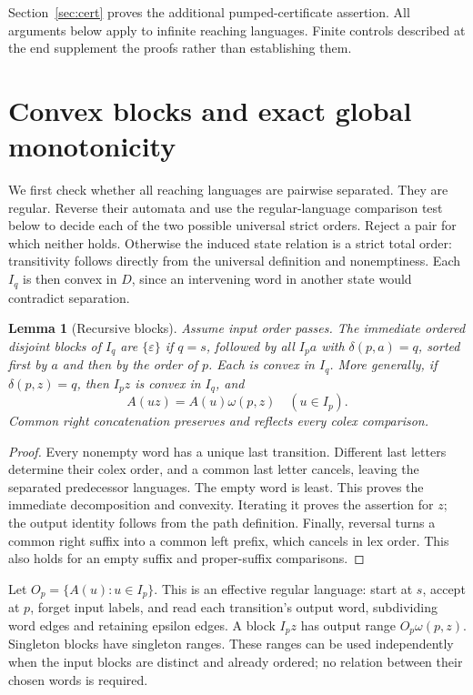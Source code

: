 \documentclass[acmsmall,screen,nonacm,11pt]{acmart}
\newcommand{\eps}{\varepsilon}
\newtheorem{lemma}[theorem]{Lemma}
\theoremstyle{definition}
\begin{document}
Section~\ref{sec:cert} proves the additional pumped-certificate assertion.
All arguments below apply to infinite reaching languages. Finite controls
described at the end supplement the proofs rather than establishing them.

\section{Convex blocks and exact global monotonicity}\label{sec:blocks}

We first check whether all reaching languages are pairwise separated. They
are regular. Reverse their automata and use the regular-language comparison
test below to decide each of the two possible universal strict orders.
Reject a pair for which neither holds. Otherwise the induced state relation
is a strict total order: transitivity follows directly from the universal
definition and nonemptiness. Each $I_q$ is then convex in $D$, since an
intervening word in another state would contradict separation.

\begin{lemma}[Recursive blocks]\label{lem:blocks}
Assume input order passes. The immediate ordered disjoint blocks of $I_q$
are $\{\eps\}$ if $q=s$, followed by all $I_p a$ with $\delta(p,a)=q$,
sorted first by $a$ and then by the order of $p$. Each is convex in $I_q$.
More generally, if $\delta(p,z)=q$, then $I_pz$ is convex in $I_q$, and
\begin{equation}\label{eq:transport}
 A(uz)=A(u)\omega(p,z)\quad(u\in I_p).
\end{equation}
Common right concatenation preserves and reflects every colex comparison.
\end{lemma}
\begin{proof}
Every nonempty word has a unique last transition. Different last letters
determine their colex order, and a common last letter cancels, leaving the
separated predecessor languages. The empty word is least. This proves the
immediate decomposition and convexity. Iterating it proves the assertion for
$z$; the output identity follows from the path definition. Finally, reversal
turns a common right suffix into a common left prefix, which cancels in lex
order. This also holds for an empty suffix and proper-suffix comparisons.
\end{proof}

Let $O_p=\{A(u):u\in I_p\}$. This is an effective regular language: start
at $s$, accept at $p$, forget input labels, and read each transition's output
word, subdividing word edges and retaining epsilon edges. A block $I_pz$
has output range $O_p\omega(p,z)$. Singleton blocks have singleton ranges.
These ranges can be used independently when the input blocks are distinct
and already ordered; no relation between their chosen words is required.
\end{document}
